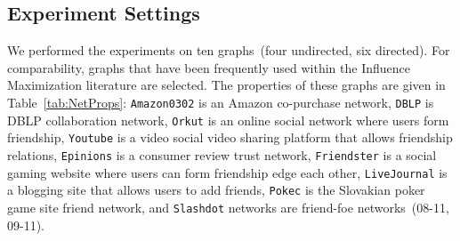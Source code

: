 \documentclass[review]{elsarticle}
\begin{document}
\begin{table}[!ht]
\caption{Properties of networks used in the experiments}\label{tab:NetProps}
\centering
\end{table}
\FloatBarrier
\subsection{Experiment Settings} \label{sec:expset}

We performed the experiments on ten graphs~(four undirected, six directed). For comparability, graphs that have been frequently used within the Influence Maximization literature are selected. The properties of these graphs are given in Table~\ref{tab:NetProps}:  {\tt Amazon0302} is an Amazon co-purchase network, {\tt DBLP} is DBLP collaboration network, {\tt Orkut} is an online social network where users form friendship,  {\tt Youtube} is a video social video sharing platform that allows friendship relations, {\tt Epinions} is a consumer review trust network, {\tt Friendster} is a social gaming website where users can form friendship edge each other, {\tt LiveJournal} is a blogging site that allows users to add friends, {\tt Pokec} is the Slovakian poker game site friend network, and {\tt Slashdot} networks are friend-foe networks~(08-11, 09-11).
\end{document}
